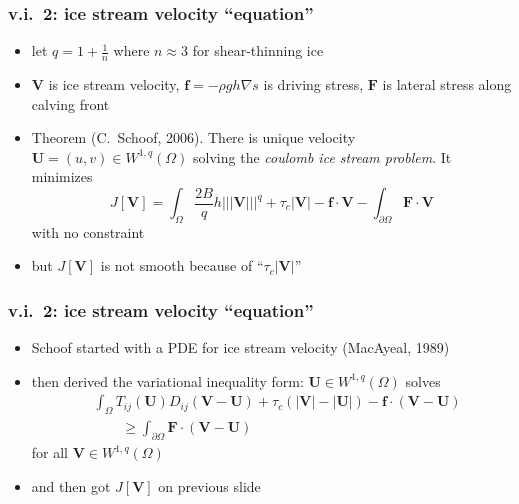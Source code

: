 \documentclass{beamer}
\newcommand{\grad}{\nabla}
\newcommand{\Tnorm}[1]{\left|\!\left|\!\left|#1\right|\!\right|\!\right|}
\begin{document}
\begin{frame}
  \frametitle{v.i.~2: ice stream velocity ``equation''}

\begin{itemize}
\item let $q = 1+\frac{1}{n}$ where $n\approx 3$ for shear-thinning ice
\item $\mathbf{V}$ is ice stream velocity, $\mathbf{f} = - \rho g h \grad s$ is driving stress, $\mathbf{F}$ is lateral stress along calving front
\item Theorem (C.~Schoof, 2006).  There is unique velocity $\mathbf{U}=(u,v)\in W^{1,q}(\Omega)$ solving the \emph{coulomb ice stream problem}.  It minimizes
\small
\begin{equation*}
J[\mathbf{V}] = \int_\Omega \frac{2 B}{q} h \Tnorm{\mathbf{V}}^q + \tau_c |\mathbf{V}| - \mathbf{f} \cdot \mathbf{V}  - \int_{\partial\Omega} \mathbf{F} \cdot \mathbf{V}
\end{equation*}
\normalsize
with no constraint
\item but $J[\mathbf{V}]$ is not smooth because of ``$\tau_c |\mathbf{V}|$''
\end{itemize}
\end{frame}


\begin{frame}
  \frametitle{v.i.~2: ice stream velocity ``equation''}

\begin{itemize}
\item Schoof started with a PDE for ice stream velocity (MacAyeal, 1989)
\item then derived the variational inequality form: $\mathbf{U} \in W^{1,q}(\Omega)$ solves
\begin{align*}
&\int_\Omega T_{ij}(\mathbf{U}) D_{ij}\left(\mathbf{V} - \mathbf{U}\right) + \tau_c \left(|\mathbf{V}| - |\mathbf{U}|\right) - \mathbf{f} \cdot \left(\mathbf{V} - \mathbf{U}\right) \\
&\qquad \ge \int_{\partial\Omega} \mathbf{F} \cdot \left(\mathbf{V} - \mathbf{U}\right)
\end{align*}
for all $\mathbf{V}\in W^{1,q}(\Omega)$
\item and then got $J[\mathbf{V}]$ on previous slide
\end{itemize}
\end{frame}
\end{document}
